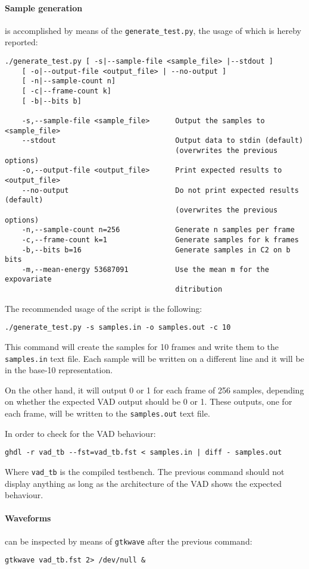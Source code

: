 \paragraph{Sample generation} is accomplished by means of the
\texttt{generate\_test.py}, the usage of which is hereby reported:
\footnotesize{
\begin{verbatim}
./generate_test.py [ -s|--sample-file <sample_file> |--stdout ]
    [ -o|--output-file <output_file> | --no-output ]
    [ -n|--sample-count n]
    [ -c|--frame-count k]
    [ -b|--bits b]

    -s,--sample-file <sample_file>      Output the samples to <sample_file>
    --stdout                            Output data to stdin (default)
                                        (overwrites the previous options)
    -o,--output-file <output_file>      Print expected results to <output_file>
    --no-output                         Do not print expected results (default)
                                        (overwrites the previous options)
    -n,--sample-count n=256             Generate n samples per frame
    -c,--frame-count k=1                Generate samples for k frames
    -b,--bits b=16                      Generate samples in C2 on b bits
    -m,--mean-energy 53687091           Use the mean m for the expovariate
                                        ditribution
\end{verbatim}
}

The recommended usage of the script is the following:
\begin{verbatim}
./generate_test.py -s samples.in -o samples.out -c 10
\end{verbatim}
This command will create the samples for 10 frames and write them to the
\texttt{samples.in} text file. Each sample will be written on a different line
and it will be in the base-10 representation.

On the other hand, it will output 0 or 1 for each frame of 256 samples, depending
on whether the expected VAD output should be 0 or 1. These outputs, one for each
frame, will be written to the \texttt{samples.out} text file.

In order to check for the VAD behaviour:
\begin{verbatim}
ghdl -r vad_tb --fst=vad_tb.fst < samples.in | diff - samples.out
\end{verbatim}
Where \texttt{vad\_tb} is the compiled testbench. The previous command should not
display anything as long as the architecture of the VAD shows the expected
behaviour.

\paragraph{Waveforms} can be inspected by means of \texttt{gtkwave} after
the previous command:
\begin{verbatim}
gtkwave vad_tb.fst 2> /dev/null &
\end{verbatim}
